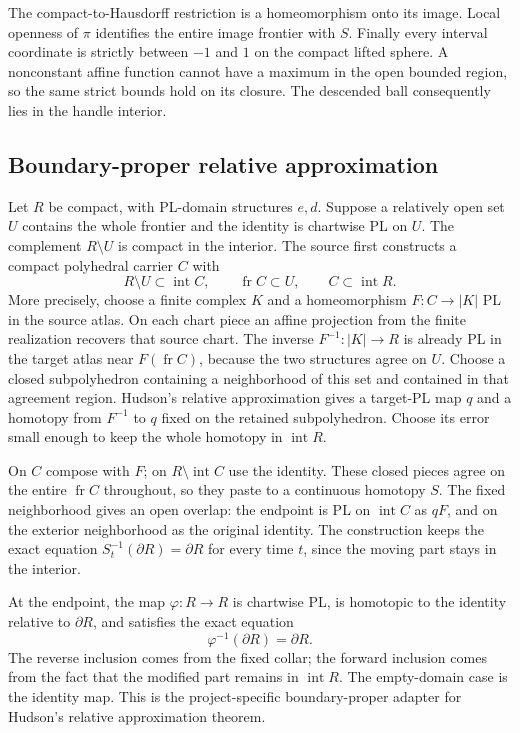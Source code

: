 The compact-to-Hausdorff restriction is a homeomorphism onto its image.
Local openness of $\pi$ identifies the entire image frontier with $S$.
Finally every interval coordinate is strictly between $-1$ and $1$ on
the compact lifted sphere. A nonconstant affine function cannot have a
maximum in the open bounded region, so the same strict bounds hold on
its closure. The descended ball consequently lies in the handle interior.

\subsection{Boundary-proper relative approximation}

Let $R$ be compact, with PL-domain structures $e,d$. Suppose a relatively open set
$U$ contains the whole frontier and the identity is chartwise PL on $U$.
The complement $R\setminus U$ is compact in the interior.  The source first
constructs a compact polyhedral carrier $C$ with
\[
 R\setminus U\subset\operatorname{int}C,\qquad
 \operatorname{fr}C\subset U,\qquad C\subset\operatorname{int}R.
\]
More precisely, choose a finite complex $K$ and a homeomorphism
$F:C\to|K|$ PL in the source atlas. On each chart piece an affine
projection from the finite realization recovers that source chart.
The inverse $F^{-1}:|K|\to R$ is already PL in the target atlas near
$F(\operatorname{fr}C)$, because the two structures agree on $U$.
Choose a closed subpolyhedron containing a neighborhood of this set and
contained in that agreement region. Hudson's relative approximation
\cite[Lemma 4.2 and homotopy-control remark, pp.~92--94]{Hudson1969}
gives a target-PL map $q$ and a homotopy from $F^{-1}$ to $q$ fixed on
the retained subpolyhedron. Choose its error small enough to keep the
whole homotopy in $\operatorname{int}R$.

On $C$ compose with $F$; on $R\setminus\operatorname{int}C$ use the
identity. These closed pieces agree on the entire $\operatorname{fr}C$
throughout, so they paste to a continuous homotopy $S$. The fixed neighborhood gives an
open overlap: the endpoint is PL on $\operatorname{int}C$ as $qF$, and
on the exterior neighborhood as the original identity. The construction
keeps the exact equation $S_t^{-1}(\partial R)=\partial R$ for every time
$t$, since the moving part stays in the interior.

At the endpoint, the map $\varphi:R\to R$ is chartwise PL, is homotopic to
the identity relative to $\partial R$, and satisfies the exact equation
\[
 \varphi^{-1}(\partial R)=\partial R.
\]
The reverse inclusion comes from the fixed collar; the forward inclusion comes
from the fact that the modified part remains in $\operatorname{int}R$.
The empty-domain case is the identity map.  This is the project-specific
boundary-proper adapter for Hudson's relative approximation theorem.

